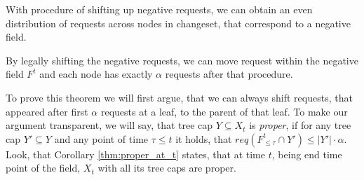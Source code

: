With procedure of shifting up negative requests, we can obtain an even 
distribution of requests across nodes in changeset, that  correspond to 
a negative field.
\begin{theorem}
By legally shifting the negative requests, we can move request within the 
negative field $F^t$ and each node has exactly $\alpha$ requests after that 
procedure.
\label{thm:legal_shifting_up}
\end{theorem}
To prove this theorem we will first argue, that we can always 
shift requests, that appeared after first $\alpha$ requests at a leaf, to the 
parent of that leaf. To make our argument transparent, we will say, that tree 
cap $Y \subseteq X_t$ is \textit{proper}, if for any tree cap $Y' \subseteq Y$ 
and any point of time $\tau \leq t$ it holds, that 
$req(F^t_{\leq \tau} \cap Y') \leq |Y'| \cdot \alpha$. Look, that Corollary 
\ref{thm:proper_at_t} states, that at time $t$, being end time point of the 
field, $X_t$ with all its tree caps are proper.

